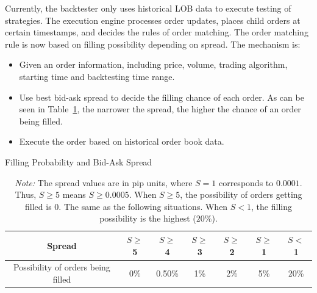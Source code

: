 Currently, the backtester only uses historical LOB data to execute testing of strategies. The execution engine processes order updates, places child orders at certain timestamps, and decides the rules of order matching. The order matching rule is now based on filling possibility depending on spread. The mechanism is:
\begin{itemize}
    \item Given an order information, including price, volume, trading algorithm, starting time and backtesting time range.
    \item Use best bid-ask spread to decide the filling chance of each order. As can be seen in Table~\ref{tab:filling_spread}, the narrower the spread, the higher the chance of an order being filled.
    \item Execute the order based on historical order book data.
\end{itemize} 
    \begin{table}[h]
        \centering
        \caption{Filling Probability and Bid-Ask Spread}
        \caption*{\textit{Note:} The spread values are in pip units, where $S=1$ corresponds to $0.0001$. Thus, $S \geq 5$ means $S \geq 0.0005$. When $S \geq 5$, the possibility of orders getting filled is $0$. The same as the following situations. When $S < 1$, the filling possibility is the highest ($20\%$).}
        \begin{tabular}{c|c|c|c|c|c|c}
            \hline
            Spread & $S \geq$ 5 & $S \geq$ 4 & $S \geq$ 3 & $S \geq$ 2 & $S \geq$ 1 & $S <$ 1 \\
            \hline
            Possibility of orders being filled & 0\% & 0.50\% & 1\% & 2\% & 5\% & 20\% \\
            \hline
        \end{tabular}
        \label{tab:filling_spread}
    \end{table}



